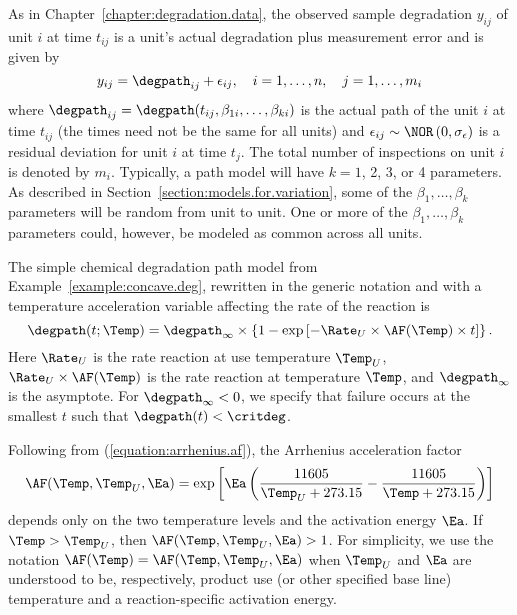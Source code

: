 As in Chapter~\ref{chapter:degradation.data}, the observed sample
degradation $y_{ij}$ of unit $i$ at time $t_{ij}$ is a unit's actual
degradation plus measurement error and is given by
\begin{equation}
\label{equation:adt.deg.path.model}
y_{ij} = \degpath_{ij} + \epsilon_{ij},\quad i
= 1, \dots, n, \quad j = 1, \dots, m_{i}
\end{equation}
where $\degpath_{ij}=\degpath(t_{ij},\beta_{1i},\dots,\beta_{ki})$ 
is the actual
path of the unit $i$ at time $t_{ij}$ (the times need not be the
same for all units) and $\epsilon_{ij}\sim \NOR
\left(0,\sigma_{\epsilon}\right)$ is a residual deviation
for unit $i$ at time $t_j$. The
total number of inspections on unit $i$ is denoted by $m_{i}$.
Typically, a path model will have $k=1$, 2, 3, or 4 parameters.
As described in Section~\ref{section:models.for.variation}, some of
the $\beta_{1},
\dots,\beta_{k}$ parameters will be random from unit to unit.  One or
more of the $\beta_{1},
\dots,\beta_{k}$ parameters could, however, be modeled as
common across all units.

The simple chemical degradation path model
from Example~\ref{example:concave.deg}, rewritten in the generic
notation and with a temperature acceleration variable affecting the
rate of the reaction is
\begin{equation}
\label{equation:nonlinear.deg.path}
\degpath(t;\Temp) = \degpath_{\infty} \times
\left \{1 -  \exp \left [-\Rate_{U} \times 
\AF(\Temp) \times t \right ] \right \}.
\end{equation}
Here $\Rate_{U}$ is the rate reaction at use temperature
$\Temp_{U}$, $\Rate_{U} \times \AF(\Temp)$ is the rate reaction at
temperature $\Temp$, and $\degpath_{\infty}$ is the asymptote.  For
$\degpath_{\infty} < 0$, we specify that failure occurs at the
smallest $t$ such that $\degpath(t) < \critdeg$.

Following from 
(\ref{equation:arrhenius.af}), the 
Arrhenius acceleration factor 
\begin{equation}
\label{equation:adt.arrhenius.af}
\AF(\Temp,\Temp_{U},\Ea) = \exp\left[
\Ea\left( \frac{11605}{\Temp_{U}+273.15} -  \frac{11605}{\Temp+273.15}
 \right) \right]
\end{equation}
depends only on the two temperature levels and the activation energy $\Ea$.
If $\Temp > \Temp_{U}$, then $\AF(\Temp,\Temp_{U},\Ea) > 1$.
For simplicity, we use the notation
$\AF(\Temp)=\AF(\Temp,\Temp_{U},\Ea)$ when
$\Temp_{U}$ and $\Ea$ are understood to be, respectively, product use
(or other specified
base line) temperature and a reaction-specific activation energy.

